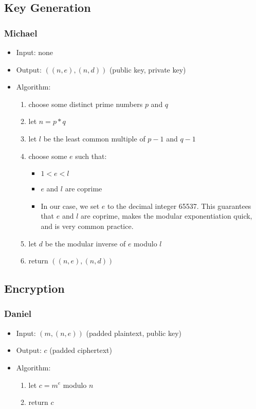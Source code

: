 
\subsection{Key Generation}

\begin{frame}
\frametitle{Michael}
\begin{itemize}
\item Input: none
\item Output: $((n, e), (n, d))$ (public key, private key)
\item Algorithm:
  \begin{enumerate}
  \item choose some distinct prime numbers $p$ and $q$
  \item let $n = p * q$
  \item let $l$ be the least common multiple of
    $p - 1$ and $q - 1$
  \item choose some $e$ such that:
  \begin{itemize}
    \item $1 < e < l$
    \item $e$ and $l$ are coprime
    \item In our case, we set $e$ to the decimal integer
      65537. This guarantees that $e$ and $l$ are coprime,
      makes the modular exponentiation quick, and is very
      common practice.
  \end{itemize}
  \item let $d$ be the modular inverse of $e$
    modulo $l$
  \item return $((n, e), (n, d))$
  \end{enumerate}
\end{itemize}
\end{frame}


\subsection{Encryption}

\begin{frame}
\frametitle{Daniel}
\begin{itemize}
\item Input: $(m, (n, e))$ (padded plaintext, public key)
\item Output: $c$ (padded ciphertext)
\item Algorithm:
  \begin{enumerate}
  \item let $c = m^e$ modulo $n$
  \item return $c$
  \end{enumerate}
\end{itemize}
\end{frame}

